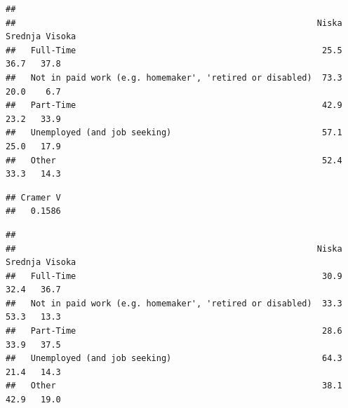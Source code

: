\documentclass[
]{article}
\newenvironment{Shaded}{\begin{snugshade}}{\end{snugshade}}
\newcommand{\CommentTok}[1]{\textcolor[rgb]{0.56,0.35,0.01}{\textit{#1}}}
\newcommand{\DecValTok}[1]{\textcolor[rgb]{0.00,0.00,0.81}{#1}}
\newcommand{\FunctionTok}[1]{\textcolor[rgb]{0.13,0.29,0.53}{\textbf{#1}}}
\newcommand{\NormalTok}[1]{#1}
\newcommand{\OtherTok}[1]{\textcolor[rgb]{0.56,0.35,0.01}{#1}}
\newcommand{\SpecialCharTok}[1]{\textcolor[rgb]{0.81,0.36,0.00}{\textbf{#1}}}
\begin{document}
\begin{verbatim}
##                                                           
##                                                            Niska Srednja Visoka
##   Full-Time                                                 25.5    36.7   37.8
##   Not in paid work (e.g. homemaker', 'retired or disabled)  73.3    20.0    6.7
##   Part-Time                                                 42.9    23.2   33.9
##   Unemployed (and job seeking)                              57.1    25.0   17.9
##   Other                                                     52.4    33.3   14.3
\end{verbatim}

\begin{Shaded}
\end{Shaded}

\begin{verbatim}
## Cramer V 
##   0.1586
\end{verbatim}

\begin{Shaded}
\end{Shaded}

\begin{verbatim}
##                                                           
##                                                            Niska Srednja Visoka
##   Full-Time                                                 30.9    32.4   36.7
##   Not in paid work (e.g. homemaker', 'retired or disabled)  33.3    53.3   13.3
##   Part-Time                                                 28.6    33.9   37.5
##   Unemployed (and job seeking)                              64.3    21.4   14.3
##   Other                                                     38.1    42.9   19.0
\end{verbatim}
\end{document}
